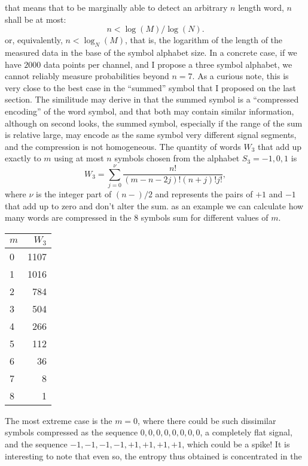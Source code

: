 \documentclass[10pt]{article}
\begin{document}
that means that to be marginally able to detect an arbitrary $n$ length word,
$n$ shall be at most:
\begin{equation}\label{eqequiprob01}
  n < \log(M)/\log(N).
\end{equation}
or, equivalently, $ n < \log_N (M) $, that is, the logarithm of the length of
the measured data in the base of the symbol alphabet size. In a concrete case,
if we have $2000$ data points per channel, and I propose a three symbol
alphabet, we cannot reliably measure probabilities beyond $n=7$. As a curious
note, this is very close to the best case in the  ``summed'' symbol that
I proposed on the last section. The similitude may derive in that
the summed symbol is a ``compressed encoding'' of the word symbol, and that
both may contain similar information, although on second looks,
the summed symbol, especially if the range  of the sum is relative large, may
encode as the same symbol very different signal segments, and the compression
is not homogeneous. The quantity of words $W_3$ that add up exactly to $m$ using at most
$n$ symbols chosen from the alphabet $S_3={-1,0,1}$ is
\begin{equation}
  W_3=\sum_{j=0}^\nu \frac{n!}{(m-n-2j)!(n+j)!j!}, 
\end{equation}
where $\nu$ is the integer part of $(n-)/2$ and represents the pairs of $+1$ and
$-1$ that add up to zero and don't alter the sum. as an example we can calculate
how many words are compressed in the 8 symbols sum for different values of $m$.
\begin{center}
  \begin{tabular}{ l | r }
    $m$ & $W_3$ \\
    \hline
    0 & 1107 \\
    1 & 1016 \\
    2 & 784 \\
    3 & 504 \\
    4 & 266 \\
    5 & 112 \\
    6 & 36 \\
    7 & 8 \\
    8 & 1 \\
    \hline
  \end{tabular}
\end{center}
The most extreme case is the $m=0$, where there could be such dissimilar symbols
compressed as the sequence $0,0,0,0,0,0,0,0$, a completely flat signal,
and the sequence $-1,-1,-1,-1,+1,+1,+1,+1$, which could be a spike! It is interesting
to note that even so, the entropy thus obtained is concentrated in the
\end{document}
